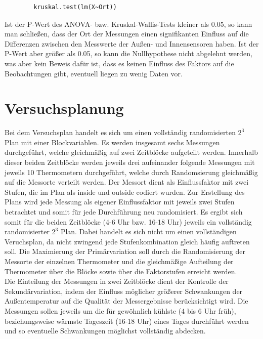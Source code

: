 \documentclass[ ngerman, fontsize= 12pt, paper=a4, headings=big, titlepage=true]{article}
\begin{document}
	\begin{lstlisting}
		kruskal.test(lm(X~Ort))
	\end{lstlisting}

	Ist der P-Wert des ANOVA- bzw. Kruskal-Wallis-Tests kleiner als 0.05, so kann man schließen, dass der Ort der Messungen einen signifikanten Einfluss auf die Differenzen zwischen den Messwerte der Außen- und Innensensoren haben. Ist der P-Wert aber größer als 0.05, so kann die Nullhypothese nicht abgelehnt werden, was aber kein Beweis dafür ist, dass es keinen Einfluss des Faktors auf die Beobachtungen gibt, eventuell liegen zu wenig Daten vor.
	
	\section{Versuchsplanung}
	Bei dem Versuchsplan handelt es sich um einen vollständig randomisierten $2^3$ Plan mit einer Blockvariablen. Es werden insgesamt sechs Messungen durchgeführt, welche gleichmäßig auf zwei Zeitblöcke aufgeteilt werden. Innerhalb dieser beiden Zeitblöcke werden jeweils drei aufeinander folgende Messungen mit jeweils 10 Thermometern durchgeführt, welche durch Randomsierung gleichmäßig auf die Messorte verteilt werden. Der Messort dient als Einflussfaktor mit zwei Stufen, die im Plan als inside und outside codiert wurden. Zur Erstellung des Plans wird jede Messung als eigener Einflussfaktor mit jeweils zwei Stufen betrachtet und somit für jede Durchführung neu randomisiert. Es ergibt sich somit für die beiden Zeitblöcke (4-6 Uhr bzw. 16-18 Uhr) jeweils ein vollständig randomisierter $2^3$ Plan. Dabei handelt es sich nicht um einen vollständigen Veruchsplan, da nicht zwingend jede Stufenkombination gleich häufig auftreten soll. Die Maximierung der Primärvariation soll durch die Randomisierung der Messorte der einzelnen Thermometer und die gleichmäßige Aufteilung der Thermometer über die Blöcke sowie über die Faktorstufen erreicht werden. \\

 Die Einteilung der Messungen in zwei Zeitblöcke dient der Kontrolle der Sekundärvariation, indem der Einfluss möglicher größerer Schwankungen der Außentemperatur auf die Qualität der Messergebnisse berücksichtigt wird. Die Messungen sollen jeweils um die für gewöhnlich kühlste (4 bis 6 Uhr früh), beziehungsweise wärmste Tageszeit (16-18 Uhr) eines Tages durchführt werden und so eventuelle Schwankungen möglichst vollständig abdecken.\\
\end{document}
